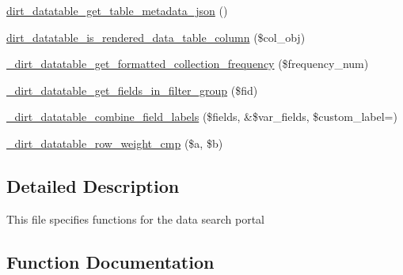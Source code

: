 \begin{DoxyCompactItemize}
\item 
\mbox{\hyperlink{dirt__datatable_8data__search__portal_8inc_a1137dc7d52708bd3c47774644024db4e}{dirt\+\_\+datatable\+\_\+get\+\_\+table\+\_\+metadata\+\_\+json}} ()
\item 
\mbox{\hyperlink{dirt__datatable_8data__search__portal_8inc_a019764deef9f6d71430ca593280f620e}{dirt\+\_\+datatable\+\_\+is\+\_\+rendered\+\_\+data\+\_\+table\+\_\+column}} (\$col\+\_\+obj)
\item 
\mbox{\hyperlink{dirt__datatable_8data__search__portal_8inc_af757754bf82778120732ef85bc845b36}{\+\_\+dirt\+\_\+datatable\+\_\+get\+\_\+formatted\+\_\+collection\+\_\+frequency}} (\$frequency\+\_\+num)
\item 
\mbox{\hyperlink{dirt__datatable_8data__search__portal_8inc_ad592e5ee59413a1ec73dfa0bcb919384}{\+\_\+dirt\+\_\+datatable\+\_\+get\+\_\+fields\+\_\+in\+\_\+filter\+\_\+group}} (\$fid)
\item 
\mbox{\hyperlink{dirt__datatable_8data__search__portal_8inc_a0f77ddb7a3b0636dce84cc95c66ace4f}{\+\_\+dirt\+\_\+datatable\+\_\+combine\+\_\+field\+\_\+labels}} (\$fields, \&\$var\+\_\+fields, \$custom\+\_\+label=\textquotesingle{}\textquotesingle{})
\item 
\mbox{\hyperlink{dirt__datatable_8data__search__portal_8inc_a76b1c95e93e5959b4adf808612de0edb}{\+\_\+dirt\+\_\+datatable\+\_\+row\+\_\+weight\+\_\+cmp}} (\$a, \$b)
\end{DoxyCompactItemize}


\subsection{Detailed Description}
This file specifies functions for the data search portal 

\subsection{Function Documentation}
\mbox{\label{dirt__datatable_8data__search__portal_8inc_a0f77ddb7a3b0636dce84cc95c66ace4f}} 
